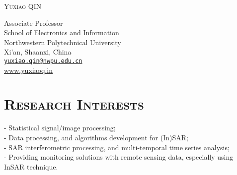 \documentclass[letterpaper]{article}
\def\name{\textsc{Yuxiao QIN}}
\begin{document}
{\huge \name}


\vspace{0.2in}

\begin{minipage}{0.8\linewidth}
  Associate Professor \\
  School of Electronics and Information\\
  Northwestern Polytechnical University \\
  Xi'an, Shaanxi, China\\ 
  \href{mailto:yuxiao.qin@nwpu.edu.cn}{\tt yuxiao.qin@nwpu.edu.cn} \\ 
  \href{www.yuxiaoq.in}{www.yuxiaoq.in}
\end{minipage}


\section*{\textsc{Research Interests}}
- Statistical signal/image processing;\\
- Data processing, and algorithms development for (In)SAR;\\
- SAR interferometric processing, and multi-temporal time series analysis;\\
- Providing monitoring solutions with remote sensing data, especially using InSAR technique. 


\end{document}
